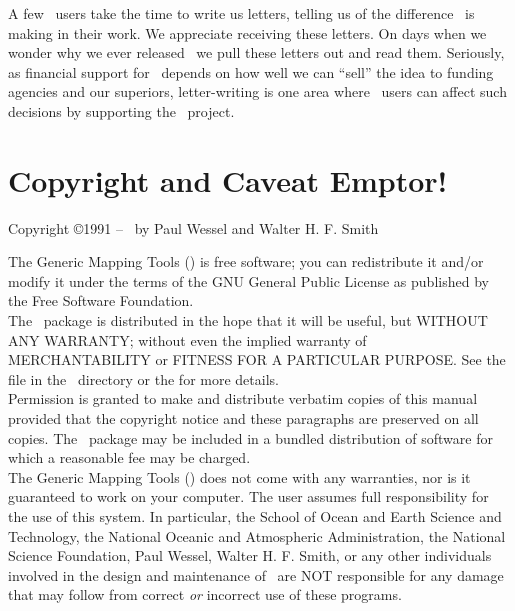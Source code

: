 A few \GMT\ users take the time to write us letters, telling us of the
difference \GMT\ is making in their work.  We appreciate receiving these
letters.  On days when we wonder why we ever released \GMT\ we pull
these letters out and read them.  Seriously, as financial support for
\GMT\ depends on how well we can ``sell'' the idea to funding agencies and
our superiors, letter-writing is one area where \GMT\ users can affect
such decisions by supporting the \GMT\ project. 


\chapter*{Copyright and Caveat Emptor!}

\begin{center}
Copyright \copyright 1991 -- \GMTDOCYEAR\ by Paul Wessel and Walter H. F. Smith
\end{center}

\vspace{\baselineskip}

The Generic Mapping Tools (\GMT) is free software; you can redistribute
it and/or modify it under the terms of the GNU General Public License
as published by the Free Software Foundation. \\

The \GMT\ package is distributed in the hope that it will be useful, but
WITHOUT ANY WARRANTY; without even the implied warranty of
MERCHANTABILITY or FITNESS FOR A PARTICULAR PURPOSE.  See the
file  in the \GMT\ directory or the
for more details. \\

Permission is granted to make and distribute verbatim copies of this
manual provided that the copyright notice and these paragraphs are
preserved on all copies.  The \GMT\ package may be included in a bundled
distribution of software for which a reasonable fee may be charged. \\

The Generic Mapping Tools (\GMT) does not come with any warranties,
nor is it guaranteed to work on your computer.  The user assumes full
responsibility for the use of this system. In particular, the School of
Ocean and Earth Science and Technology, the National Oceanic and
Atmospheric Administration, the National Science Foundation,
Paul Wessel, Walter H. F. Smith, or any other individuals involved in
the design and maintenance of \GMT\ are NOT responsible for any damage
that may follow from correct \emph{or} incorrect use of these programs.

